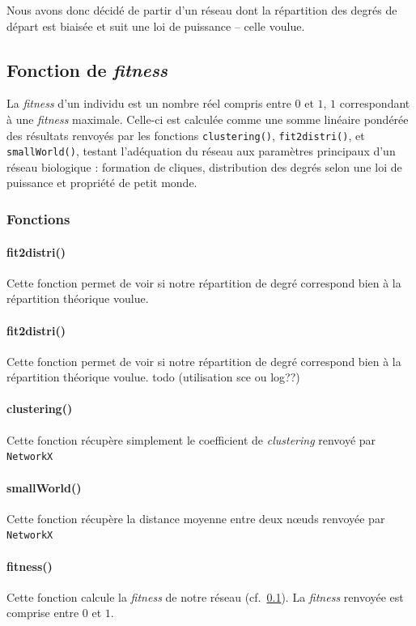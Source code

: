 Nous avons donc décidé de partir d'un réseau dont la répartition des degrés de départ est biaisée et suit une loi de puissance -- celle voulue.

\subsection{Fonction de \textit{fitness}}
\label{fitness}
La \textit{fitness} d'un individu est un nombre réel compris entre $0$ et $1$, $1$ correspondant à une \textit{fitness} maximale.
Celle-ci est calculée comme une somme linéaire pondérée des résultats renvoyés par les fonctions \texttt{clustering()}, \texttt{fit2distri()}, et \texttt{smallWorld()}, testant l'adéquation du réseau aux paramètres principaux d'un réseau biologique : formation de cliques, distribution des degrés selon une loi de puissance et propriété de petit monde.

\subsubsection{Fonctions}

\paragraph*{fit2distri()} Cette fonction permet de voir si notre répartition de degré correspond bien à la répartition théorique voulue.
\paragraph*{fit2distri()} Cette fonction permet de voir si notre répartition de degré correspond bien à  la répartition théorique voulue. todo (utilisation sce ou log??)
\paragraph*{clustering()} Cette fonction récupère simplement le coefficient de \textit{clustering} renvoyé par \verb?NetworkX?
\paragraph*{smallWorld()} Cette fonction récupère la distance moyenne entre deux nœuds renvoyée par \verb?NetworkX?
\paragraph*{fitness()} Cette fonction calcule la \textit{fitness} de notre réseau (cf.~\ref{fitness}). La \textit{fitness} renvoyée est comprise entre $0$ et $1$.
